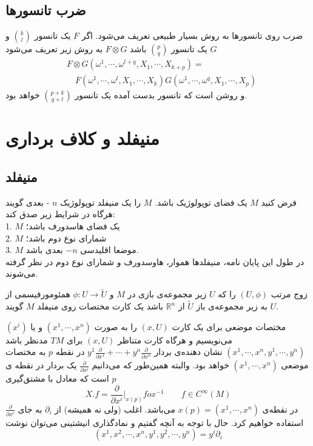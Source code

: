 \subsection{ضرب تانسورها}
ضرب روی تانسورها به روش بسیار طبیعی تعریف می‌شود. اگر $F$ یک تانسور $\binom{k}{l} $ و $G$ یک تانسور $\binom{p}{q} $ باشد $F \otimes G$ به روش زیر تعریف می‌شود
\begin{align*}
&F\otimes G(\omega^1,\cdots,\omega^{l+q},X_1,\cdots,X_{k+p}) =\\ 
&\quad F(\omega^1,\cdots,\omega^l,X_1,\cdots,X_k)G(\omega^1,\cdots,\omega^q,X_1,\cdots,X_p)  
\end{align*}
و روشن است که تانسور بدست آمده یک تانسور $\binom{p+k}{q+l} $ خواهد بود.

\section{منیفلد و کلاف برداری}

\subsection{منیفلد}

فرض کنید $ M $ یک فضای توپولوژیک باشد.  $ M $ را یک منیفلد توپولوژیک $ n $ - بعدی گویند هرگاه در شرایط زیر صدق کند: \\
1. $ M $ یک فضای هاسدورف باشد؛\\
2. $ M $ شمارای نوع دوم باشد؛\\
3. $ M $  موضعا اقلیدسی $ -n $  بعدی باشد.\\
در طول این پایان نامه، منیفلدها هموار، هاوسدورف و شمارای نوع دوم در نظر گرفته می‌شوند.

\begin{definition}
زوج مرتب $(U,\phi)$ را  که $ U $ زیر  مجموعه‌ی بازی در $ M $ و 
$ \phi :U \longrightarrow \tilde{U }$
همئومورفیسمی  از  $ U $  به  زیر مجموعه‌ی  باز  
$  \tilde{U}  $  از  $ \mathbb{R}^n  $ 
باشد یک  کارت  مختصات  روی  منیفلد  $ M $  گویند.
\end{definition}

مختصات موضعی برای  یک کارت $(x,U)$ را به صورت $(x^1,\cdots,x^n)$ و یا $(x^i)$ می‌نویسیم
و هرگاه کارت متناظر $(x,U)$ برای $ TM $ مدنظر باشد $ (x^1,\cdots,x^n,y^1,\cdots,y^n) $ نشان دهنده‌ی 
بردار
 $y^{1}\frac{\partial}{\partial x^{1}}+\cdots+y^{n}\frac{\partial}{\partial x^{n}}$ در نقطه $p$ به مختصات 
موضعی $(x^1,\cdots,x^n)$ خواهد بود. والبته همین‌طور که می‌دانیم $\frac{\partial}{\partial x^i}$ یک بردار در نقطه ی $p$ است که معادل با مشتق‌گیری
\[ X.f =\frac{\partial}{\partial x^i}\bigg|_{x(p)}fox^{-1}\qquad f\in C^\infty(M)\]
در نقطه‌ی $x(p) = (x^1,\cdots,x^n)$ می‌باشد. اغلب (ولی نه همیشه) از $\partial_i$ به جای $ \frac{\partial}{\partial x^i}$ استفاده خواهیم کرد. حال با توجه به آنچه گفتیم و نمادگذاری انیشتینی  می‌توان نوشت 
\[ (x^1,x^2,\cdots,x^n,y^1,y^2,\cdots,y^n) = y^i\partial_i\]
